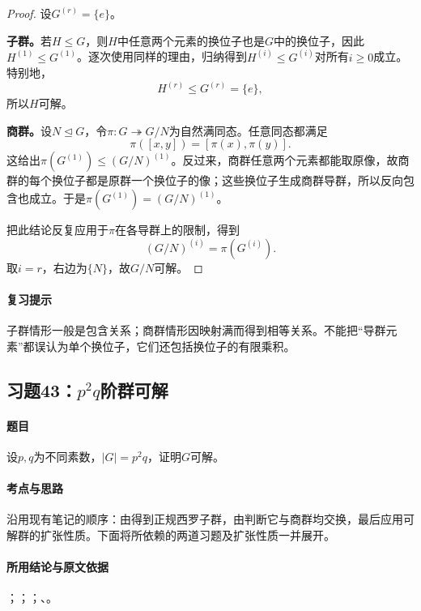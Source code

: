 
\begin{proof}
设$G^{(r)}=\{e\}$。

\textbf{子群。}若$H\le G$，则$H$中任意两个元素的换位子也是$G$中的换位子，因此$H^{(1)}\le G^{(1)}$。逐次使用同样的理由，归纳得到$H^{(i)}\le G^{(i)}$对所有$i\ge0$成立。特别地，
\[
H^{(r)}\le G^{(r)}=\{e\},
\]
所以$H$可解。

\textbf{商群。}设$N\trianglelefteq G$，令$\pi:G\twoheadrightarrow G/N$为自然满同态。任意同态都满足
\[
\pi([x,y])=[\pi(x),\pi(y)].
\]
这给出$\pi(G^{(1)})\le(G/N)^{(1)}$。反过来，商群任意两个元素都能取原像，故商群的每个换位子都是原群一个换位子的像；这些换位子生成商群导群，所以反向包含也成立。于是$\pi(G^{(1)})=(G/N)^{(1)}$。

把此结论反复应用于$\pi$在各导群上的限制，得到
\[
(G/N)^{(i)}=\pi(G^{(i)}).
\]
取$i=r$，右边为$\{N\}$，故$G/N$可解。
\end{proof}

\paragraph{复习提示}
子群情形一般是包含关系；商群情形因映射满而得到相等关系。不能把“导群元素”都误认为单个换位子，它们还包括换位子的有限乘积。


\subsection{习题43：\texorpdfstring{$p^2q$阶群可解}{p2q阶群可解}}
\label{ex:2:43}

\paragraph{题目}
设$p,q$为不同素数，$|G|=p^2q$，证明$G$可解。

\paragraph{考点与思路}
沿用现有笔记的顺序：由得到正规西罗子群，由判断它与商群均交换，最后应用可解群的扩张性质。下面将所依赖的两道习题及扩张性质一并展开。

\paragraph{所用结论与原文依据}
；；；、。

